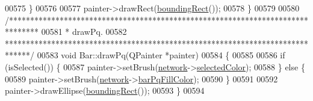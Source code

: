 \begin{DoxyCode}
00575   \}
00576 
00577   painter->drawRect(\hyperlink{group___models_ga8279d8109019cc7e139e2023690496be}{boundingRect}());
00578 \}
00579 
00580 \textcolor{comment}{/*******************************************************************************}
00581 \textcolor{comment}{ * drawPq.}
00582 \textcolor{comment}{ ******************************************************************************/}
00583 \textcolor{keywordtype}{void} Bar::drawPq(QPainter *painter)
00584 \{
00585 
00586   \textcolor{keywordflow}{if} (isSelected()) \{
00587     painter->setBrush(\hyperlink{class_bar_a80025f13884750add58cc61b318357ff}{network}->\hyperlink{group___graphics_gaa9e21b8e2a24b0495e776a51e1aeed94}{selectedColor});
00588   \} \textcolor{keywordflow}{else} \{
00589     painter->setBrush(\hyperlink{class_bar_a80025f13884750add58cc61b318357ff}{network}->\hyperlink{class_network_a386f492f548ec13f5d0e350c4f2217aa}{barPqFillColor});
00590   \}
00591 
00592   painter->drawEllipse(\hyperlink{group___models_ga8279d8109019cc7e139e2023690496be}{boundingRect}());
00593 \}
00594 
\end{DoxyCode}
